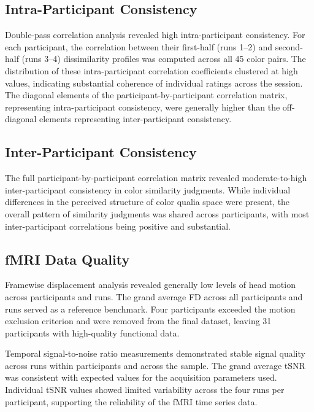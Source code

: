\documentclass[11pt]{article}
\begin{document}
\subsection{Intra-Participant Consistency}

Double-pass correlation analysis revealed high intra-participant consistency. For each participant, the correlation between their first-half (runs 1--2) and second-half (runs 3--4) dissimilarity profiles was computed across all 45 color pairs. The distribution of these intra-participant correlation coefficients clustered at high values, indicating substantial coherence of individual ratings across the session. The diagonal elements of the participant-by-participant correlation matrix, representing intra-participant consistency, were generally higher than the off-diagonal elements representing inter-participant consistency.

\subsection{Inter-Participant Consistency}

The full participant-by-participant correlation matrix revealed moderate-to-high inter-participant consistency in color similarity judgments. While individual differences in the perceived structure of color qualia space were present, the overall pattern of similarity judgments was shared across participants, with most inter-participant correlations being positive and substantial.

\subsection{fMRI Data Quality}

Framewise displacement analysis revealed generally low levels of head motion across participants and runs. The grand average FD across all participants and runs served as a reference benchmark. Four participants exceeded the motion exclusion criterion and were removed from the final dataset, leaving 31 participants with high-quality functional data.

Temporal signal-to-noise ratio measurements demonstrated stable signal quality across runs within participants and across the sample. The grand average tSNR was consistent with expected values for the acquisition parameters used. Individual tSNR values showed limited variability across the four runs per participant, supporting the reliability of the fMRI time series data.
\end{document}
